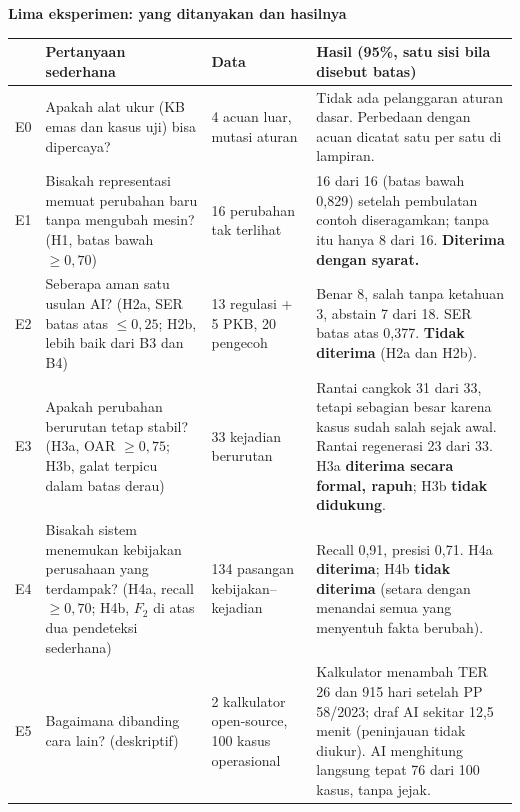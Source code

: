 \documentclass[10pt,a4paper]{article}
\begin{document}
\begin{center}
\end{center}

\newpage
{\Large\bfseries Lima eksperimen: yang ditanyakan dan hasilnya}

\vspace{0.3em}
\small
\begin{tabularx}{\textwidth}{@{}p{0.8cm} L p{3.3cm} L@{}}
\toprule
 & Pertanyaan sederhana & Data & Hasil (95\%, satu sisi bila disebut batas) \\
\midrule
E0 & Apakah alat ukur (KB emas dan kasus uji) bisa dipercaya? & 4 acuan luar, mutasi aturan & Tidak ada pelanggaran aturan dasar. Perbedaan dengan acuan dicatat satu per satu di lampiran. \\
E1 & Bisakah representasi memuat perubahan baru tanpa mengubah mesin? (H1, batas bawah $\geq 0{,}70$) & 16 perubahan tak terlihat & 16 dari 16 (batas bawah 0,829) setelah pembulatan contoh diseragamkan; tanpa itu hanya 8 dari 16. \textbf{Diterima dengan syarat.} \\
E2 & Seberapa aman satu usulan AI? (H2a, SER batas atas $\leq 0{,}25$; H2b, lebih baik dari B3 dan B4) & 13 regulasi + 5 PKB, 20 pengecoh & Benar 8, salah tanpa ketahuan 3, abstain 7 dari 18. SER batas atas 0,377. \textbf{Tidak diterima} (H2a dan H2b). \\
E3 & Apakah perubahan berurutan tetap stabil? (H3a, OAR $\geq 0{,}75$; H3b, galat terpicu dalam batas derau) & 33 kejadian berurutan & Rantai cangkok 31 dari 33, tetapi sebagian besar karena kasus sudah salah sejak awal. Rantai regenerasi 23 dari 33. H3a \textbf{diterima secara formal, rapuh}; H3b \textbf{tidak didukung}. \\
E4 & Bisakah sistem menemukan kebijakan perusahaan yang terdampak? (H4a, recall $\geq 0{,}70$; H4b, $F_2$ di atas dua pendeteksi sederhana) & 134 pasangan kebijakan--kejadian & Recall 0,91, presisi 0,71. H4a \textbf{diterima}; H4b \textbf{tidak diterima} (setara dengan menandai semua yang menyentuh fakta berubah). \\
E5 & Bagaimana dibanding cara lain? (deskriptif) & 2 kalkulator open-source, 100 kasus operasional & Kalkulator menambah TER 26 dan 915 hari setelah PP 58/2023; draf AI sekitar 12,5 menit (peninjauan tidak diukur). AI menghitung langsung tepat 76 dari 100 kasus, tanpa jejak. \\
\bottomrule
\end{tabularx}
\end{document}
